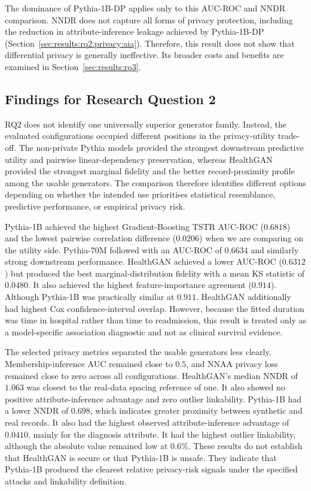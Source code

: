 The dominance of Pythia-1B-DP applies only to this AUC-ROC and NNDR
comparison. NNDR does not capture all forms of privacy protection,
including the reduction in attribute-inference leakage achieved by
Pythia-1B-DP
(Section~\ref{sec:results:rq2:privacy:aia}). Therefore, this result does
not show that differential privacy is generally ineffective. Its broader
costs and benefits are examined in Section~\ref{sec:results:rq3}.

\subsection*{Findings for Research Question 2}
\label{sec:results:rq2:answer}

RQ2 does not identify one universally superior generator family. Instead,
the evaluated configurations occupied different positions in the
privacy-utility trade-off. The non-private Pythia models provided the
strongest downstream predictive utility and pairwise linear-dependency
preservation, whereas HealthGAN provided the strongest marginal fidelity
and the better record-proximity profile among the usable
generators. The comparison therefore identifies different options
depending on whether the intended use prioritises statistical resemblance,
predictive performance, or empirical privacy risk.

Pythia-1B achieved the highest Gradient-Boosting TSTR
AUC-ROC ($0.6818$) and the lowest pairwise correlation difference
($0.0206$) when we are comparing on the utility side.
Pythia-70M followed with an AUC-ROC of $0.6634$ and similarly
strong downstream performance. HealthGAN achieved a lower AUC-ROC
($0.6312$) but produced the best marginal-distribution fidelity with a
mean KS statistic of $0.0480$. It also achieved the highest
feature-importance agreement ($0.914$). Although Pythia-1B was practically
similar at $0.911$. HealthGAN additionally had highest Cox
confidence-interval overlap. However, because the fitted duration was
time in hospital rather than time to readmission, this result is treated
only as a model-specific association diagnostic and not as clinical
survival evidence.

The selected privacy metrics separated the usable generators less clearly.
Membership-inference AUC remained close to $0.5$, and NNAA privacy loss
remained close to zero across all configurations. HealthGAN's median NNDR
of $1.063$ was closest to the real-data spacing reference of one. It also
showed no positive attribute-inference advantage and zero outlier
linkability. Pythia-1B had a lower NNDR of $0.698$, which indicates greater proximity
between synthetic and real records. It also had the highest observed
attribute-inference advantage of $0.0410$, mainly for the diagnosis
attribute. It had the highest outlier linkability, although the
absolute value remained low at $0.6\%$. These results do not establish
that HealthGAN is secure or that Pythia-1B is unsafe. They indicate that
Pythia-1B produced the clearest relative privacy-risk signals under the
specified attacks and linkability definition.


